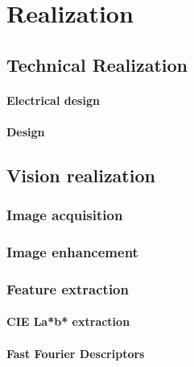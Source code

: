 \documentclass[11pt,fleqn,,a4paper,twoside,openright]{book}
\begin{document}
\part{Realization}

\chapter{Technical Realization}

\subsection{Electrical design}

\subsection{Design}

\chapter{Vision realization}


\section{Image acquisition}


\section{Image enhancement}


\section{Feature extraction}\label{Segmentation}


\subsection{CIE La*b* extraction}\label{CIELab}


\subsection{Fast Fourier Descriptors}\label{FFT}
\end{document}
